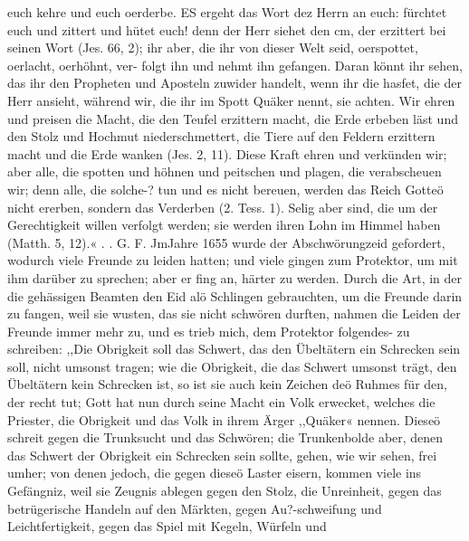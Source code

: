 euch kehre und euch oerderbe. ES ergeht das Wort dez Herrn
an euch: fürchtet euch und zittert und hütet euch! denn der Herr
siehet den cm, der erzittert bei seinen Wort (Jes. 66, 2); ihr aber,
die ihr von dieser Welt seid, oerspottet, oerlacht, oerhöhnt, ver-
folgt ihn und nehmt ihn gefangen. Daran könnt ihr sehen, das
ihr den Propheten und Aposteln zuwider handelt, wenn ihr die hasfet,
die der Herr ansieht, während wir, die ihr im Spott Quäker
nennt, sie achten. Wir ehren und preisen die Macht, die den
Teufel erzittern macht, die Erde erbeben läst und den Stolz und
Hochmut niederschmettert, die Tiere auf den Feldern erzittern
macht und die Erde wanken (Jes. 2, 11). Diese Kraft ehren
und verkünden wir; aber alle, die spotten und höhnen und
peitschen und plagen, die verabscheuen wir; denn alle, die solche-?
tun und es nicht bereuen, werden das Reich Gotteö nicht ererben,
sondern das Verderben (2. Tess. 1).
Selig aber sind, die um der Gerechtigkeit willen verfolgt
werden; sie werden ihren Lohn im Himmel haben (Matth. 5, 12).« . .
G. F.
JmJahre 1655 wurde der Abschwörungzeid gefordert, wodurch
viele Freunde zu leiden hatten; und viele gingen zum Protektor, um
mit ihm darüber zu sprechen; aber er fing an, härter zu werden.
Durch die Art, in der die gehässigen Beamten den Eid alö
Schlingen gebrauchten, um die Freunde darin zu fangen, weil sie
wusten, das sie nicht schwören durften, nahmen die Leiden der
Freunde immer mehr zu, und es trieb mich, dem Protektor folgendes-
zu schreiben:
,,Die Obrigkeit soll das Schwert, das den Übeltätern ein
Schrecken sein soll, nicht umsonst tragen; wie die Obrigkeit, die
das Schwert umsonst trägt, den Übeltätern kein Schrecken ist, so
ist sie auch kein Zeichen deö Ruhmes für den, der recht tut;
Gott hat nun durch seine Macht ein Volk erwecket, welches
die Priester, die Obrigkeit und das Volk in ihrem Ärger ,,Quäker«
nennen. Dieseö schreit gegen die Trunksucht und das Schwören;
die Trunkenbolde aber, denen das Schwert der Obrigkeit ein
Schrecken sein sollte, gehen, wie wir sehen, frei umher; von denen
jedoch, die gegen dieseö Laster eisern, kommen viele ins Gefängniz,
weil sie Zeugnis ablegen gegen den Stolz, die Unreinheit, gegen
das betrügerische Handeln auf den Märkten, gegen Au?-schweifung
und Leichtfertigkeit, gegen das Spiel mit Kegeln, Würfeln und


